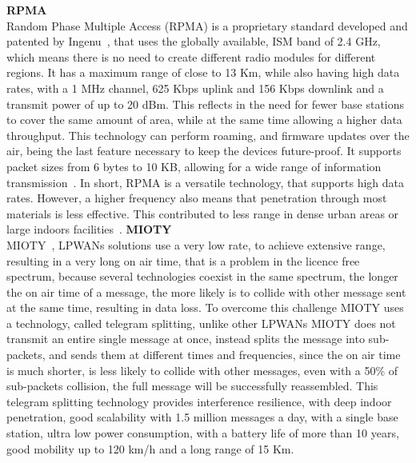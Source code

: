 \textbf{RPMA}\\

Random Phase Multiple Access (RPMA) is a proprietary standard developed and patented by Ingenu~\cite{Ingenu}, that uses the globally available, \gls{ISM} band of 2.4 GHz, which means there is no need to create different radio modules for different regions. It has a maximum range of close to 13 Km, while also having high data rates, with a 1 MHz channel, 625 Kbps uplink and 156 Kbps downlink and a transmit power of up to 20 dBm.
This reflects in the need for fewer  base stations to cover  the same amount of  area, while at the same time allowing a higher data throughput. 
This technology can perform roaming, and firmware updates over the air, being the last feature necessary to keep the devices future-proof. It supports packet sizes from 6 bytes to 10 KB, allowing for a wide range of information transmission~\cite{Bernardo2019}. 
In short, RPMA is a versatile technology, that supports high data rates. However, a higher frequency also means that penetration through most materials is less effective. This contributed to less range in dense urban areas or large indoors facilities~\cite{LPPenaQueralta2019}.\newline\newline
\textbf{MIOTY}\\

MIOTY~\cite{MIOTY}, LPWANs solutions use a very low rate, to achieve extensive range, resulting in a very long on air time, that is a problem in the licence free spectrum, because several technologies coexist in the same spectrum, the longer the on air time of a message, the more likely is to collide with other message sent at the same time, resulting in data loss. To overcome this challenge MIOTY uses a technology, called telegram splitting, unlike other LPWANs MIOTY does not transmit an entire single message at once, instead splits the message into sub-packets, and sends them at different times and frequencies, since the on air time is much shorter, is less likely to collide with other messages, even with a 50\% of sub-packets collision, the full message will be successfully reassembled. This telegram splitting technology provides interference resilience, with deep indoor penetration, good scalability with 1.5 million messages a day, with a single base station, ultra low power consumption, with a battery life of more than 10 years, good mobility up to 120 km/h and a long range of 15 Km.


